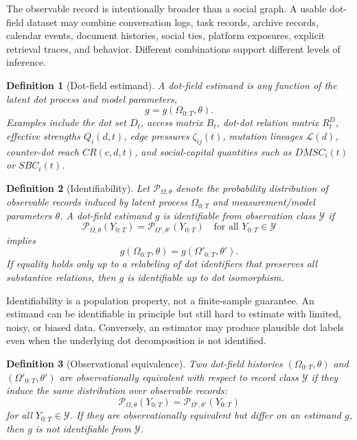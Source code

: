 \documentclass[11pt]{article}
\newtheorem{definition}{Definition}
\theoremstyle{remark}
\begin{document}
The observable record is intentionally broader than a social graph. A
usable dot-field dataset may combine conversation logs, task records,
archive records, calendar events, document histories, social ties,
platform exposures, explicit retrieval traces, and behavior. Different
combinations support different levels of inference.

\begin{definition}[Dot-field estimand]\label{def:dot-field-estimand}
A dot-field estimand is any function of the latent dot process and model
parameters,
$$
g=g(\Omega_{0:T},\theta).
$$
Examples include the dot set $D_t$, access matrix $B_t$, dot-dot relation
matrix $R_t^D$, effective strengths $Q_i(d,t)$, edge pressures $\zeta_{ij}(t)$,
mutation lineages $\mathcal L(d)$, counter-dot reach $CR(c,d,t)$, and
social-capital quantities such as $DMSC_i(t)$ or $SBC_i(t)$.
\end{definition}

\begin{definition}[Identifiability]\label{def:dot-identifiability}
Let $\mathcal P_{\Omega,\theta}$ denote the probability distribution of
observable records induced by latent process $\Omega_{0:T}$ and
measurement/model parameters $\theta$. A dot-field estimand $g$ is
identifiable from observation class $\mathcal Y$ if
$$
\mathcal P_{\Omega,\theta}(Y_{0:T})=\mathcal P_{\Omega',\theta'}(Y_{0:T})
\quad \text{for all }Y_{0:T}\in\mathcal Y
$$
implies
$$
g(\Omega_{0:T},\theta)=g(\Omega'_{0:T},\theta').
$$
If equality holds only up to a relabeling of dot identifiers that
preserves all substantive relations, then $g$ is identifiable up to dot
isomorphism.
\end{definition}

Identifiability is a population property, not a finite-sample guarantee.
An estimand can be identifiable in principle but still hard to estimate
with limited, noisy, or biased data. Conversely, an estimator may produce
plausible dot labels even when the underlying dot decomposition is not
identified.

\begin{definition}[Observational equivalence]\label{def:observational-equivalence}
Two dot-field histories $(\Omega_{0:T},\theta)$ and
$(\Omega'_{0:T},\theta')$ are observationally equivalent with respect to
record class $\mathcal Y$ if they induce the same distribution over
observable records:
$$
\mathcal P_{\Omega,\theta}(Y_{0:T})=\mathcal P_{\Omega',\theta'}(Y_{0:T})
$$
for all $Y_{0:T}\in\mathcal Y$. If they are observationally equivalent
but differ on an estimand $g$, then $g$ is not identifiable from
$\mathcal Y$.
\end{definition}
\end{document}
